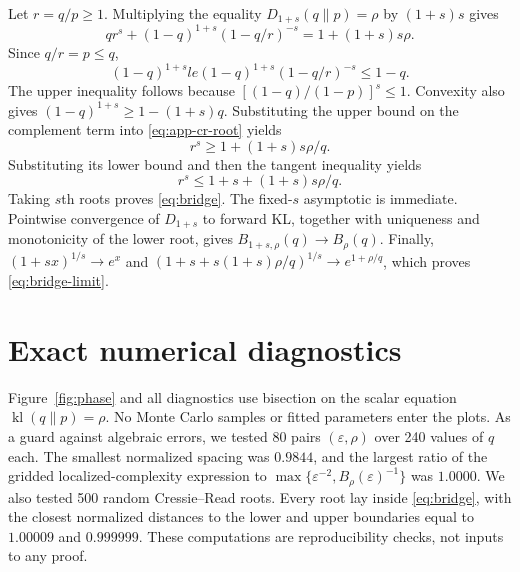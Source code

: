 \documentclass{article}
\theoremstyle{remark}
\newcommand{\kl}{\operatorname{kl}}
\newcommand{\eps}{\varepsilon}
\begin{document}
Let $r=q/p\ge1$.  Multiplying the equality $D_{1+s}(q\|p)=\rho$ by $(1+s)s$ gives
\begin{equation}
 qr^s+(1-q)^{1+s}(1-q/r)^{-s}=1+(1+s)s\rho.
 \label{eq:app-cr-root}
\end{equation}
Since $q/r=p\le q$, \[ (1-q)^{1+s}le (1-q)^{1+s}(1-q/r)^{-s}\le1-q. \] The upper inequality follows because $[(1-q)/(1-p)]^s\le1$.  Convexity also gives $(1-q)^{1+s}\ge1-(1+s)q$.  Substituting the upper bound on the complement term into \eqref{eq:app-cr-root} yields \[ r^s\ge1+(1+s)s\rho/q. \] Substituting its lower bound and then the tangent inequality yields \[ r^s\le1+s+(1+s)s\rho/q. \] Taking $s$th roots proves \eqref{eq:bridge}.  The fixed-$s$ asymptotic is immediate.  Pointwise convergence of $D_{1+s}$ to forward KL, together with uniqueness and monotonicity of the lower root, gives $B_{1+s,\rho}(q)\to B_\rho(q)$.  Finally, $(1+sx)^{1/s}\to e^x$ and $(1+s+s(1+s)\rho/q)^{1/s}\to e^{1+\rho/q}$, which proves \eqref{eq:bridge-limit}.

\section{Exact numerical diagnostics}
\label{app:numerics}

Figure~\ref{fig:phase} and all diagnostics use bisection on the scalar equation $\kl(q\|p)=\rho$.  No Monte Carlo samples or fitted parameters enter the plots.  As a guard against algebraic errors, we tested 80 pairs $(\eps,\rho)$ over 240 values of $q$ each.  The smallest normalized spacing was $0.9844$, and the largest ratio of the gridded localized-complexity expression to $\max\{\eps^{-2},B_\rho(\eps)^{-1}\}$ was $1.0000$.  We also tested 500 random Cressie--Read roots.  Every root lay inside \eqref{eq:bridge}, with the closest normalized distances to the lower and upper boundaries equal to $1.00009$ and $0.999999$.  These computations are reproducibility checks, not inputs to any proof.
\end{document}
